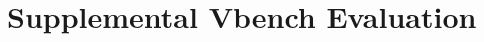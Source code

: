 \begin{comment}
\begin{table}[h]
\centering
\caption{Results on Open-Sora-Plan with 93 frames and 720p resolution. We select motion smoothness and temporal flickering from VBench as they measure frame transition, which are crucial for sparse attention methods.}
\resizebox{0.40\columnwidth}{!}{
\begin{tabular}{cccc}
    \toprule
    \textbf{Model} & \makecell{\textbf{Motion} \\ \textbf{Smoothness}} & \makecell{\textbf{Temporal} \\ \textbf{Flickering}}  & \textbf{Speedup}  \\
    \midrule
    Base & 99.15\% & 98.76\%  & 1.00$\times$  \\ 
    MLCD & \textbf{99.30\%} & 99.22\%  & 5.00$\times$  \\ 
    \midrule
    $\text{Ours}_{r\text{=0.150}}$ & 99.08\% & \textbf{99.31}\%  & \textbf{7.40$\times$}   \\ 
    \bottomrule
\end{tabular}}
\label{tab:open_sora_results}
\end{table}
\end{comment}

\section{Supplemental Vbench Evaluation}

